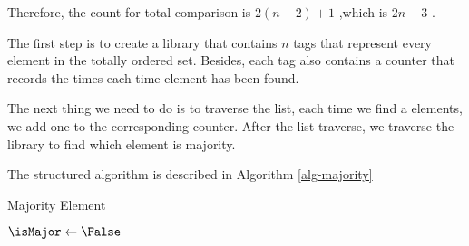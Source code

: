 \begin{questions}
    Therefore, the count for total comparison is \(2(n-2)+1\) ,which is
    \(2n-3\) .


    \question
    The first step is to create a library that contains \(n\) tags that represent every element in the totally ordered set. Besides, each tag also contains a counter that records the times each time element has been found.

    The next thing we need to do is to traverse the list, each time we find a elements, we add one to the corresponding counter. After the list traverse, we traverse the library to find which element is majority.

    The structured algorithm is described in Algorithm \ref{alg-majority}

    \begin{algorithm}
        \caption{Majority Element}
        \label{algo-majority}



        $\isMajor \gets \False$




        \Return{\isMajor}
    \end{algorithm}



\end{questions}


